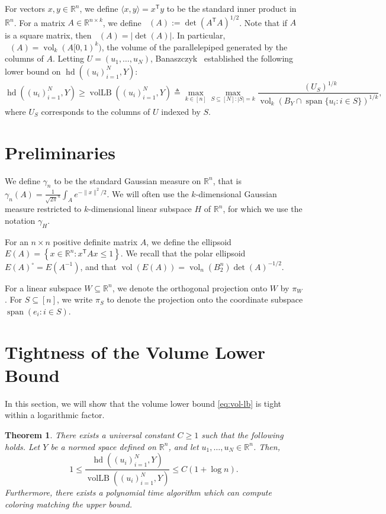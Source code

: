 \documentclass{article}
\newtheorem{theorem}{Theorem}
\newcommand{\R}{{\mathbb{R}}}
\newcommand{\T}{\mathsf T}
\newcommand{\eqdef}{\triangleq}
\newcommand{\inner}[2]{\langle #1, #2 \rangle}
\newcommand{\set}[1]{\left\{ #1 \right\}}
\DeclareMathOperator{\vollb}{volLB}
\DeclareMathOperator{\hd}{hd}
\DeclareMathOperator{\detb}{|det|}
\DeclareMathOperator{\vol}{vol}
\DeclareMathOperator{\lspan}{span}
\begin{document}
For vectors $x,y \in \R^n$, we define $\inner{x}{y} = x^\T y$ to be the standard
inner product in $\R^n$. For a matrix $A \in \R^{n \times k}$, we define
$\detb(A) := \det(A^\T A)^{1/2}$. Note that if $A$ is a square matrix, then
$\detb(A) = |\det(A)|$. In particular, $\detb(A) = \vol_k(A[0,1)^k)$, the volume
of the parallelepiped generated by the columns of $A$.  Letting $U =
(u_1,\dots,u_N)$, Banaszczyk~\cite{Bana93} established the following lower bound
on $\hd((u_i)_{i = 1}^N, Y)$:
\begin{equation}
  \label{eq:vol-lb}
  \hd((u_i)_{i = 1}^N, Y) \ge \vollb((u_i)_{i = 1}^N, Y) \eqdef
  \max_{k \in [n]} \max_{S \subseteq [N]: |S| = k}
\frac{\detb(U_S)^{1/k}}{\vol_{k}(B_Y \cap
\lspan\{u_i: i \in S\})^{1/k}},
\end{equation}
where $U_S$ corresponds to the columns of $U$ indexed by $S$.

\section{Preliminaries}

We define $\gamma_n$ to be the standard Gaussian measure on $\R^n$, that is
$\gamma_n(A) = \frac{1}{\sqrt{2\pi}^n} \int_A e^{-\|x\|^2/2}$. We will often use
the $k$-dimensional Gaussian measure restricted to $k$-dimensional linear
subspace $H$ of $\R^n$, for which we use the notation $\gamma_H$.

For an $n \times n$ positive definite matrix $A$, we define the ellipsoid $E(A)
= \set{x \in \R^n: x^\T A x \leq 1}$. We recall that the polar ellipsoid
$E(A)^\circ = E(A^{-1})$, and that $\vol(E(A)) = \vol_n(B_2^n) \det(A)^{-1/2}$.

For a linear subspace $W \subseteq \R^n$, we denote the orthogonal projection
onto $W$ by $\pi_W$. For $S \subseteq [n]$, we write $\pi_S$ to denote the
projection onto the coordinate subspace $\lspan(e_i: i \in S)$.

\section{Tightness of the Volume Lower Bound}

In this section, we will show that the volume lower bound \eqref{eq:vol-lb} is
tight within a logarithmic factor. 

\begin{theorem}\label{thm:tightness}
There exists a universal constant $C \geq 1$ such that the following
holds. Let $Y$ be a normed space defined on $\R^n$, and let $u_1,
\ldots, u_N \in \R^n$. Then,
\[
1 \le \frac{\hd((u_i)_{i = 1}^N, Y)}{\vollb((u_i)_{i = 1}^N, Y) } \le C(1+\log n).
\]
Furthermore, there exists a polynomial time algorithm which can compute coloring
matching the upper bound. 
\end{theorem}
\end{document}

